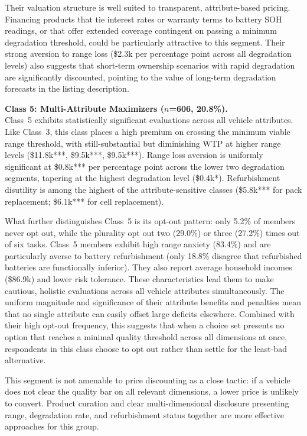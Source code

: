 \documentclass[a4paper,fleqn]{cas-sc}   %
\begin{document}
Their valuation structure is well suited to transparent, attribute-based pricing. Financing products that tie interest rates or warranty terms to battery SOH readings, or that offer extended coverage contingent on passing a minimum degradation threshold, could be particularly attractive to this segment. Their strong aversion to range loss (\$2.3k per percentage point across all degradation levels) also suggests that short-term ownership scenarios with rapid degradation are significantly discounted, pointing to the value of long-term degradation forecasts in the listing description.

\medskip

\noindent\textbf{Class 5: Multi-Attribute Maximizers ($n$=606, 20.8\%).}\\
Class~5 exhibits statistically significant evaluations across all vehicle attributes. Like Class~3, this class places a high premium on crossing the minimum viable range threshold, with still-substantial but diminishing WTP at higher range levels (\$11.8k***, \$9.5k***, \$9.5k***). Range loss aversion is uniformly significant at \$0.8k*** per percentage point across the lower two degradation segments, tapering at the highest degradation level (\$0.4k*). Refurbishment disutility is among the highest of the attribute-sensitive classes (\$5.8k*** for pack replacement; \$6.1k*** for cell replacement).

What further distinguishes Class~5 is its opt-out pattern: only 5.2\% of members never opt out, while the plurality opt out two (29.0\%) or three (27.2\%) times out of six tasks. Class~5 members exhibit high range anxiety (83.4\%) and are particularly averse to battery refurbishment (only 18.8\% disagree that refurbished batteries are functionally inferior). They also report average household incomes (\$86.9k) and lower risk tolerance. These characteristics lead them to make cautious, holistic evaluations across all vehicle attributes simultaneously. The uniform magnitude and significance of their attribute benefits and penalties mean that no single attribute can easily offset large deficits elsewhere. Combined with their high opt-out frequency, this suggests that when a choice set presents no option that reaches a minimal quality threshold across all dimensions at once, respondents in this class choose to opt out rather than settle for the least-bad alternative.

This segment is not amenable to price discounting as a close tactic: if a vehicle does not clear the quality bar on all relevant dimensions, a lower price is unlikely to convert. Product curation and clear multi-dimensional disclosure presenting range, degradation rate, and refurbishment status together are more effective approaches for this group.
\end{document}
